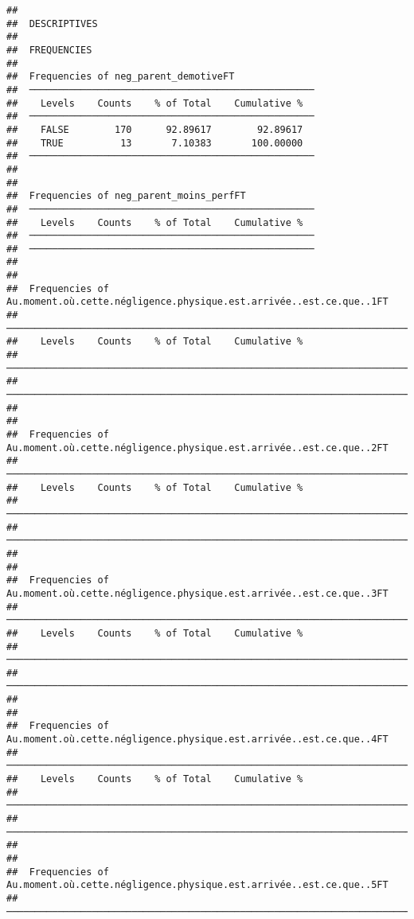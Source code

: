 \documentclass[
]{article}
\begin{document}
\begin{verbatim}
## 
##  DESCRIPTIVES
## 
##  FREQUENCIES
## 
##  Frequencies of neg_parent_demotiveFT               
##  ────────────────────────────────────────────────── 
##    Levels    Counts    % of Total    Cumulative %   
##  ────────────────────────────────────────────────── 
##    FALSE        170      92.89617        92.89617   
##    TRUE          13       7.10383       100.00000   
##  ────────────────────────────────────────────────── 
## 
## 
##  Frequencies of neg_parent_moins_perfFT             
##  ────────────────────────────────────────────────── 
##    Levels    Counts    % of Total    Cumulative %   
##  ────────────────────────────────────────────────── 
##  ────────────────────────────────────────────────── 
## 
## 
##  Frequencies of Au.moment.où.cette.négligence.physique.est.arrivée..est.ce.que..1FT 
##  ────────────────────────────────────────────────────────────────────────────────── 
##    Levels    Counts    % of Total    Cumulative %   
##  ────────────────────────────────────────────────────────────────────────────────── 
##  ────────────────────────────────────────────────────────────────────────────────── 
## 
## 
##  Frequencies of Au.moment.où.cette.négligence.physique.est.arrivée..est.ce.que..2FT 
##  ────────────────────────────────────────────────────────────────────────────────── 
##    Levels    Counts    % of Total    Cumulative %   
##  ────────────────────────────────────────────────────────────────────────────────── 
##  ────────────────────────────────────────────────────────────────────────────────── 
## 
## 
##  Frequencies of Au.moment.où.cette.négligence.physique.est.arrivée..est.ce.que..3FT 
##  ────────────────────────────────────────────────────────────────────────────────── 
##    Levels    Counts    % of Total    Cumulative %   
##  ────────────────────────────────────────────────────────────────────────────────── 
##  ────────────────────────────────────────────────────────────────────────────────── 
## 
## 
##  Frequencies of Au.moment.où.cette.négligence.physique.est.arrivée..est.ce.que..4FT 
##  ────────────────────────────────────────────────────────────────────────────────── 
##    Levels    Counts    % of Total    Cumulative %   
##  ────────────────────────────────────────────────────────────────────────────────── 
##  ────────────────────────────────────────────────────────────────────────────────── 
## 
## 
##  Frequencies of Au.moment.où.cette.négligence.physique.est.arrivée..est.ce.que..5FT 
##  ────────────────────────────────────────────────────────────────────────────────── 

\end{verbatim}
\end{document}

